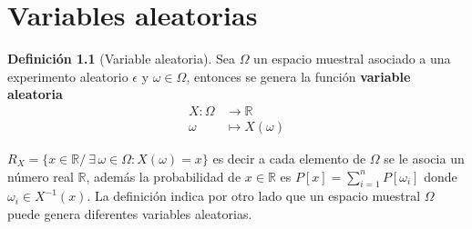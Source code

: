 \documentclass[10pt,]{krantz}
\theoremstyle{definition}
\newtheorem{definition}{Definición}[chapter]
\theoremstyle{definition}
\theoremstyle{definition}
\theoremstyle{definition}
\theoremstyle{remark}
\begin{document}
\hypertarget{variables-aleatorias}{%
\chapter{Variables aleatorias}\label{variables-aleatorias}}

\begin{definition}[Variable aleatoria]
\protect\hypertarget{def:unnamed-chunk-21}{}{\label{def:unnamed-chunk-21} {} }Sea \(\Omega\) un espacio muestral asociado a una experimento aleatorio \(\epsilon\) y \(\omega\in\Omega\), entonces se genera la función \textbf{variable aleatoria}
\begin{align*}
  X:\Omega&\longrightarrow \mathbb{R}\\
  \omega&\longmapsto X(\omega)
\end{align*}
\end{definition}
\(R_{X}=\{x\in \mathbb {R} /\ \exists \,\omega \in \Omega :X(\omega )=x\}\)
es decir a cada elemento de \(\Omega\) se le asocia un número real \(\mathbb{R}\), además la probabilidad de \(x\in \mathbb{R}\) es \(P[x]= \sum^{n}_{i=1}P\left[\omega_i\right]\) donde \(\omega_i\in X^{-1}(x)\). La definición indica por otro lado que un espacio muestral \(\Omega\) puede genera diferentes variables aleatorias.
\end{document}
